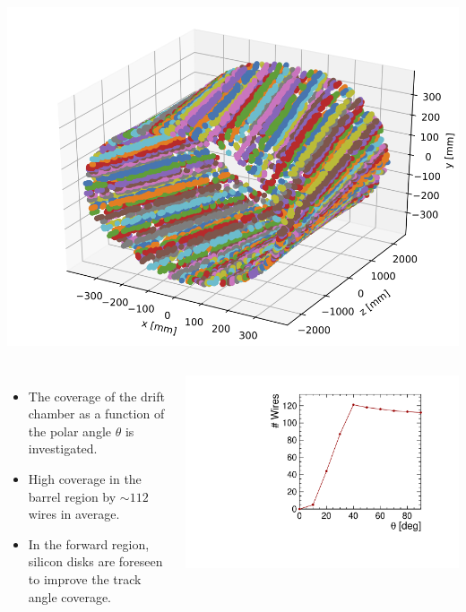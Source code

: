 \documentclass[final,xcolor={dvipsnames,svgnames,x11names,table}]{beamer}
\begin{document}
\begin{frame}
\begin{textblock}{39.5}
\begin{tcolorbox}[title=The simulation of the drift chamber with FCCSW]
\begin{columns}
        \centering
        \includegraphics[width=\textwidth]{Figures/allHits}

    \end{columns}


    \begin{columns}
      \begin{itemize}
        \item The coverage of the drift chamber as a function of the polar angle $\theta$ is investigated. \vspace{0.5cm}
        \item High coverage in the barrel region by $\sim 112$ wires in average. \vspace{0.5cm}
        \item In the forward region, silicon disks are foreseen to improve the track angle coverage. \vspace{0.5cm}
      \end{itemize}

        \centering
        \includegraphics[width=\textwidth]{Figures/numWires}
    \end{columns}


\end{tcolorbox}
\end{textblock}
\end{frame}
\end{document}
